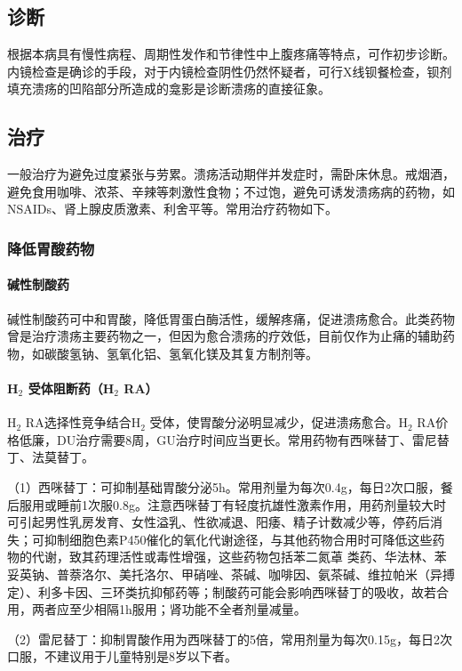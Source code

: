 \subsection{诊断}

根据本病具有慢性病程、周期性发作和节律性中上腹疼痛等特点，可作初步诊断。内镜检查是确诊的手段，对于内镜检查阴性仍然怀疑者，可行X线钡餐检查，钡剂填充溃疡的凹陷部分所造成的龛影是诊断溃疡的直接征象。

\subsection{治疗}

一般治疗为避免过度紧张与劳累。溃疡活动期伴并发症时，需卧床休息。戒烟酒，避免食用咖啡、浓茶、辛辣等刺激性食物；不过饱，避免可诱发溃疡病的药物，如NSAIDs、肾上腺皮质激素、利舍平等。常用治疗药物如下。

\subsubsection{降低胃酸药物}
\paragraph{碱性制酸药}

碱性制酸药可中和胃酸，降低胃蛋白酶活性，缓解疼痛，促进溃疡愈合。此类药物曾是治疗溃疡主要药物之一，但因为愈合溃疡的疗效低，目前仅作为止痛的辅助药物，如碳酸氢钠、氢氧化铝、氢氧化镁及其复方制剂等。
\paragraph{H$_{2}$ 受体阻断药（H$_2$ RA）}

H$_2$ RA选择性竞争结合H$_{2}$ 受体，使胃酸分泌明显减少，促进溃疡愈合。H$_2$
RA价格低廉，DU治疗需要8周，GU治疗时间应当更长。常用药物有西咪替丁、雷尼替丁、法莫替丁。

（1）西咪替丁：可抑制基础胃酸分泌5h。常用剂量为每次0.4g，每日2次口服，餐后服用或睡前1次服0.8g。注意西咪替丁有轻度抗雄性激素作用，用药剂量较大时可引起男性乳房发育、女性溢乳、性欲减退、阳痿、精子计数减少等，停药后消失；可抑制细胞色素P450催化的氧化代谢途径，与其他药物合用时可降低这些药物的代谢，致其药理活性或毒性增强，这些药物包括苯二氮䓬
类药、华法林、苯妥英钠、普萘洛尔、美托洛尔、甲硝唑、茶碱、咖啡因、氨茶碱、维拉帕米（异搏定）、利多卡因、三环类抗抑郁药等；制酸药可能会影响西咪替丁的吸收，故若合用，两者应至少相隔1h服用；肾功能不全者剂量减量。

（2）雷尼替丁：抑制胃酸作用为西咪替丁的5倍，常用剂量为每次0.15g，每日2次口服，不建议用于儿童特别是8岁以下者。

